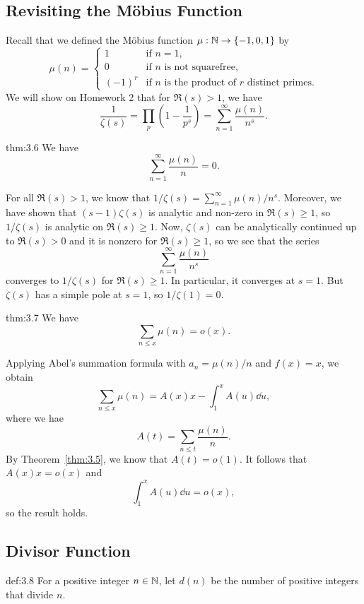 \subsection{Revisiting the M\"obius Function}\label{subsec:3.3}
Recall that we defined the M\"obius function $\mu : \mathbb{N} \to \{-1, 0, 1\}$ by 
\[ \mu(n) = \begin{cases} 1 & \text{if } n = 1, \\ 0 & \text{if $n$ is not squarefree,} \\ (-1)^r & \text{if $n$ is the product of $r$ distinct primes.} \end{cases} \]
We will show on Homework 2 that for $\Re(s) > 1$, we have 
\[ \frac1{\zeta(s)} = \prod_p \left( 1 - \frac1{p^s} \right) = \sum_{n=1}^\infty \frac{\mu(n)}{n^s}. \]

\begin{theo}{thm:3.6}
We have 
\[ \sum_{n=1}^\infty \frac{\mu(n)}n = 0. \]
\end{theo}
\begin{pf}
For all $\Re(s) > 1$, we know that $1/\zeta(s) = \sum_{n=1}^\infty \mu(n)/n^s$. 
Moreover, we have shown that $(s-1)\zeta(s)$ is analytic 
and non-zero in $\Re(s) \geq 1$, so $1/\zeta(s)$ is analytic on $\Re(s) \geq 1$. 
Now, $\zeta(s)$ can be analytically continued up to $\Re(s) > 0$ and it is nonzero for $\Re(s) \geq 1$,
so we see that the series 
\[ \sum_{n=1}^\infty \frac{\mu(n)}{n^s} \] 
converges to $1/\zeta(s)$ for $\Re(s) \geq 1$. In particular, it converges at $s = 1$. But 
$\zeta(s)$ has a simple pole at $s = 1$, so $1/\zeta(1) = 0$. 
\end{pf}

\begin{theo}{thm:3.7}
We have 
\[ \sum_{n\leq x} \mu(n) = o(x). \]
\end{theo}
\begin{pf}
Applying Abel's summation formula with $a_n = \mu(n) / n $ and $f(x) = x$, we obtain 
\[ \sum_{n\leq x} \mu(n) = A(x)x - \int_1^x A(u)\dd u, \]
where we hae 
\[ A(t) = \sum_{n\leq t} \frac{\mu(n)}n. \]
By Theorem~\ref{thm:3.5}, we know that $A(t) = o(1)$. It follows that $A(x) x = o(x)$ and 
\[ \int_1^x A(u)\dd u = o(x), \]
so the result holds. 
\end{pf}

\subsection{Divisor Function}\label{subsec:3.4}

\vspace{2ex}
\begin{defn}{def:3.8}
For a positive integer $n \in \mathbb{N}$, let $d(n)$ be the number of positive integers that 
divide $n$. 
\end{defn}


